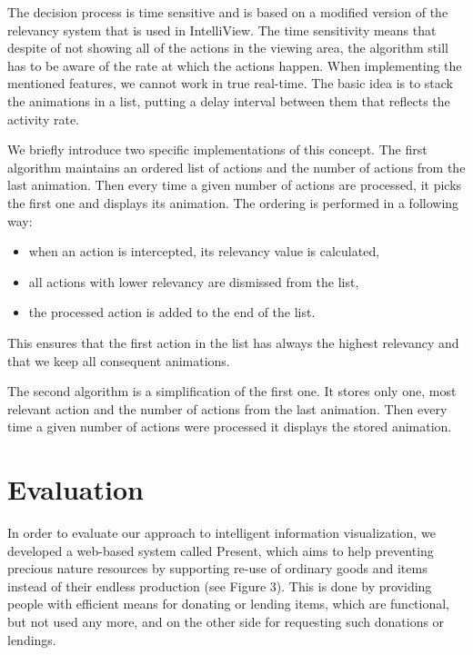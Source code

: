 \documentclass[6pt]{article}
\begin{document}
The decision process is time sensitive and is based on a modified version of the relevancy system that is used in IntelliView. The time sensitivity means that despite of not showing all of the actions in the viewing area, the algorithm still has to be aware of the rate at which the actions happen. When implementing the mentioned features, we cannot work in true real-time. The basic idea is to stack the animations in a list, putting a delay interval between them that reflects the activity rate.

We briefly introduce two specific implementations of this concept. The first algorithm maintains an ordered list of actions and the number of actions from the last animation. Then every time a given number of actions are processed, it picks the first one and displays its animation.
The ordering is performed in a following way:

\begin{itemize}
\item{when an action is intercepted, its relevancy value is calculated,}
\item{all actions with lower relevancy are dismissed from the list,}
\item{the processed action is added to the end of the list.}
\end{itemize}
This ensures that the first action in the list has always the highest relevancy and that we keep all consequent animations.

The second algorithm is a simplification of the first one. It stores only one, most relevant action and the number of actions from the last animation. Then every time a given number of actions were processed it displays the stored animation.

\section{Evaluation}
In order to evaluate our approach to intelligent information visualization, we developed a web-based system called Present, which aims to help preventing precious nature resources by supporting re-use of ordinary goods and items instead of their endless production (see Figure 3). This is done by providing people with efficient means for donating or lending items, which are functional, but not used any more, and on the other side for requesting such donations or lendings.
\end{document}
